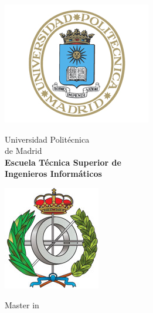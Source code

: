 \begin{titlepage}

\begin{minipage}{0.15\linewidth}
\hspace*{-2.5cm}
\noindent
\includegraphics[scale=0.5]{include/EscUpm.png} \qquad\qquad
\end{minipage}
\begin{minipage}{0.7\linewidth}
\begin{center}
\huge{ Universidad Politécnica\\de Madrid }\\
\vspace*{0.5cm}
\Large{\textbf{Escuela Técnica Superior de \\
Ingenieros Informáticos}}
\end{center}
\end{minipage}
\begin{minipage}{0.2\linewidth}
\includegraphics[scale=0.5]{include/FacInformatica.png} 
\end{minipage}

\vspace*{1cm}
\begin{center}
\Large{Master in  \Master{} }
\end{center}


\end{titlepage}
